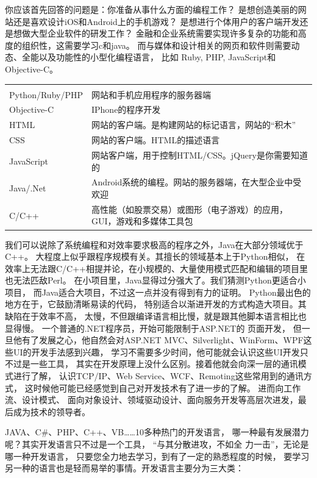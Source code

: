 \documentclass{book}
\begin{document}
你应该首先回答的问题是：你准备从事什么方面的编程工作？
是想创造美丽的网站还是喜欢设计iOS和Android上的手机游戏？
是想进行个体用户的客户端开发还是想做大型企业软件的研发工作？
金融和企业系统需要实现许多复杂的功能和高度的组织性，这需要学习c和java。
而与媒体和设计相关的网页和软件则需要动态、全能以及功能性的小型化编程语言，
比如 Ruby, PHP, JavaScript和Objective-C。

\begin{tabular}{ll}
	\multirow{1}{*}{}			
	& \multicolumn{1}{c}{}\\
	Python/Ruby/PHP & 网站和手机应用程序的服务器端\\
	Objective-C &  	IPhone的程序开发\\	
	HTML & 网站的客户端。是构建网站的标记语言，网站的“积木”\\
	CSS & 网站的客户端。HTML的描述语言\\
	JavaScript & 网站客户端，用于控制HTML/CSS。jQuery是你需要知道的\\	
	Java/.Net & Android系统的编程。网站的服务器端，在大型企业中受欢迎\\
	C/C++ & 高性能（如股票交易）或图形（电子游戏）的应用，GUI，游戏和多媒体工具包\\						
\end{tabular}

我们可以说除了系统编程和对效率要求极高的程序之外，Java在大部分领域优于C++。
大程度上似乎跟程序规模有关。其擅长的领域基本上于Python相似，
在效率上无法跟C/C++相提并论，在小规模的、大量使用模式匹配和编辑的项目里也无法匹敌Perl。
在小项目里，Java显得过分强大了。我们猜测Python更适合小项目，
而Java适合大项目，不过这一点并没有得到有力的证明。
Python最出色的地方在于，它鼓励清晰易读的代码，
特别适合以渐进开发的方式构造大项目。其缺陷在于效率不高，
太慢，不但跟编译语言相比慢，就是跟其他脚本语言相比也显得慢。
一个普通的.NET程序员，开始可能限制于ASP.NET的 页面开发，
但一旦他有了发展之心，他自然会对ASP.NET MVC、Silverlight、WinForm、WPF这些UI的开发手法感到兴趣，
学习不需要多少时间，他可能就会认识这些UI开发只不过是一些工具，
其实在开发原理上没什么区别。接着他就会向深一层的通讯模式进行了解，
认识TCP/IP、Web Service、WCF、Remoting这些常用到的通讯方式，
这时候他可能已经感觉到自己对开发技术有了进一步的了解。
进而向工作流、设计模式、 面向对象设计、领域驱动设计、面向服务开发等高层次进发，最后成为技术的领导者。

JAVA、C\#、PHP、C++、VB……10多种热门的开发语言，
哪一种最有发展潜力呢？其实开发语言只不过是一个工具，
“与其分散进攻，不如全 力一击”，无论是哪一种开发语言，
只要您全力地去学习，到有了一定的熟悉程度的时候，
要学习另一种的语言也是轻而易举的事情。开发语言主要分为三大类：
\end{document}
